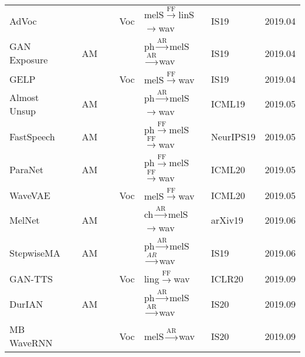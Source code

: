 \documentclass{article}
\begin{document}
\begin{center}
\begin{longtable}{l | l | l | l | l }
		AdVoc~\cite{neekhara2019expediting}                  & ~~~~~~~~Voc      & {\color{red}melS}$\stackrel{\text{FF}}{\longrightarrow}${\color{red}linS}$\rightarrow$wav          &IS19& 2019.04          \\
		GAN Exposure~\cite{guo2019new}           & AM      & {\color{blue}ph}$\stackrel{\text{AR}}{\longrightarrow}${\color{red}melS}$\stackrel{\text{AR}}{\longrightarrow}$wav           &IS19& 2019.04      \\
		GELP~\cite{juvela2019gelp}                   & ~~~~~~~~Voc      & {\color{red}melS}$\stackrel{\text{FF}}{\longrightarrow}$wav          &IS19& 2019.04         \\
		Almost Unsup~\cite{ren2019almost}             & AM       & {\color{blue}ph}$\stackrel{\text{AR}}{\longrightarrow}${\color{red}melS}$\rightarrow$wav               & ICML19 & 2019.05         \\
		FastSpeech~\cite{ren2019fastspeech}             & AM       & {\color{blue}ph}$\stackrel{\text{FF}}{\longrightarrow}${\color{red}melS}$\stackrel{\text{FF}}{\longrightarrow}$wav               & NeurIPS19 & 2019.05         \\
		ParaNet~\cite{peng2020non}                & AM     & {\color{blue}ph}$\stackrel{\text{FF}}{\longrightarrow}${\color{red}melS}$\stackrel{\text{FF}}{\longrightarrow}$wav               & ICML20 & 2019.05        \\
		WaveVAE~\cite{peng2020non}                & ~~~~~~~~Voc     & {\color{red}melS}$\stackrel{\text{FF}}{\longrightarrow}$wav               & ICML20 & 2019.05        \\
		MelNet~\cite{vasquez2019melnet}                 & AM       &{\color{blue}ch}$\stackrel{\text{AR}}{\longrightarrow}${\color{red}melS}$\stackrel{}{\longrightarrow}$wav               & arXiv19 & 2019.06        \\
		StepwiseMA~\cite{he2019robust}            & AM       &{\color{blue}ph}$\stackrel{\text{AR}}{\longrightarrow}${\color{red}melS}$\stackrel{AR}{\longrightarrow}$wav               & IS19 & 2019.06        \\
		GAN-TTS~\cite{binkowski2019high}                & ~~~~~~~~Voc      & {\color{green}ling}$\stackrel{\text{FF}}{\longrightarrow}$wav   & ICLR20 & 2019.09        \\
		DurIAN~\cite{yu2020durian}                 & AM & {\color{blue}ph}$\stackrel{\text{AR}}{\longrightarrow}${\color{red}melS}$\stackrel{\text{AR}}{\longrightarrow}$wav          &IS20& 2019.09         \\
		MB WaveRNN~\cite{yu2020durian}            & ~~~~~~~~Voc & {\color{red}melS}$\stackrel{\text{AR}}{\longrightarrow}$wav          &IS20& 2019.09         \\

\end{longtable}
\end{center}
\end{document}
